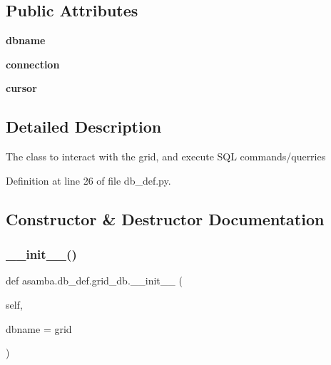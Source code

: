 \subsection*{Public Attributes}
\begin{DoxyCompactItemize}
\item 
\mbox{\label{classasamba_1_1db__def_1_1grid__db_aaf61555b930002afaaf8f8382648e354}} 
{\bfseries dbname}
\item 
\mbox{\label{classasamba_1_1db__def_1_1grid__db_a93434f2a337d35270309f51e8174e4fa}} 
{\bfseries connection}
\item 
\mbox{\label{classasamba_1_1db__def_1_1grid__db_a29dc328457e15c0490c74cc0c4984fb5}} 
{\bfseries cursor}
\end{DoxyCompactItemize}


\subsection{Detailed Description}
\begin{DoxyVerb}The class to interact with the grid, and execute SQL commands/querries
\end{DoxyVerb}
 

Definition at line 26 of file db\+\_\+def.\+py.



\subsection{Constructor \& Destructor Documentation}
\mbox{\label{classasamba_1_1db__def_1_1grid__db_a12b1aeeefe8ddf8d57ccf1dcdcd005c9}} 
\subsubsection{\texorpdfstring{\+\_\+\+\_\+init\+\_\+\+\_\+()}{\_\_init\_\_()}}
{\footnotesize\ttfamily def asamba.\+db\+\_\+def.\+grid\+\_\+db.\+\_\+\+\_\+init\+\_\+\+\_\+ (\begin{DoxyParamCaption}\item[{}]{self,  }\item[{}]{dbname = {\ttfamily \textquotesingle{}grid\textquotesingle{}} }\end{DoxyParamCaption})}

